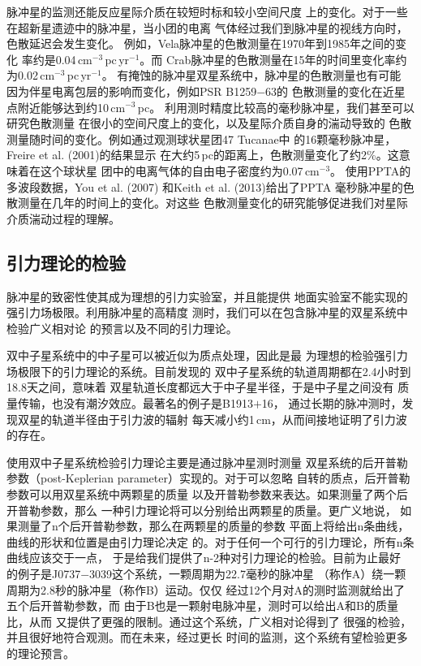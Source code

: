 脉冲星的监测还能反应星际介质在较短时标和较小空间尺度
上的变化。对于一些在超新星遗迹中的脉冲星，当小团的电离
气体经过我们到脉冲星的视线方向时，色散延迟会发生变化。
例如，Vela脉冲星的色散测量在1970年到1985年之间的变化
率约是0.04\,cm$^{-3}$\,pc\,yr$^{-1}$\supercite{hhc85}。而
Crab脉冲星的色散测量在15年的时间里变化率约为0.02\,cm$^{-3}$\,pc\,yr$^{-1}$\supercite{lps88}。
有掩蚀的脉冲星双星系统中，脉冲星的色散测量也有可能
因为伴星电离包层的影响而变化，例如PSR B1259$-$63的
色散测量的变化在近星点附近能够达到约10\,cm$^{-3}$\,pc\supercite{wjm04}。
利用测时精度比较高的毫秒脉冲星，我们甚至可以研究色散测量
在很小的空间尺度上的变化，以及星际介质自身的湍动导致的
色散测量随时间的变化。例如通过观测球状星团47 Tucanae中
的16颗毫秒脉冲星，Freire et al. (2001)\supercite{fkl+01}的结果显示
在大约5\,pc的距离上，色散测量变化了约2\%。这意味着在这个球状星
团中的电离气体的自由电子密度约为0.07\,cm$^{-3}$。
使用PPTA的多波段数据，You et al. (2007)\supercite{yhc+07}
和Keith et al. (2013)\supercite{Keith13}给出了PPTA
毫秒脉冲星的色散测量在几年的时间上的变化。对这些
色散测量变化的研究能够促进我们对星际介质湍动过程的理解。

\subsection{引力理论的检验}

脉冲星的致密性使其成为理想的引力实验室，并且能提供
地面实验室不能实现的强引力场极限。利用脉冲星的高精度
测时，我们可以在包含脉冲星的双星系统中检验广义相对论
的预言以及不同的引力理论。

双中子星系统中的中子星可以被近似为质点处理，因此是最
为理想的检验强引力场极限下的引力理论的系统。目前发现的
双中子星系统的轨道周期都在2.4小时到18.8天之间，意味着
双星轨道长度都远大于中子星半径，于是中子星之间没有
质量传输，也没有潮汐效应。最著名的例子是B1913$+$16，
通过长期的脉冲测时，发现双星的轨道半径由于引力波的辐射
每天减小约1\,cm，从而间接地证明了引力波的存在。

使用双中子星系统检验引力理论主要是通过脉冲星测时测量
双星系统的后开普勒参数（post-Keplerian parameter）实现的。对于可以忽略
自转的质点，后开普勒参数可以用双星系统中两颗星的质量
以及开普勒参数来表达。如果测量了两个后开普勒参数，那么
一种引力理论将可以分别给出两颗星的质量。更广义地说，
如果测量了n个后开普勒参数，那么在两颗星的质量的参数
平面上将给出n条曲线，曲线的形状和位置是由引力理论决定
的。对于任何一个可行的引力理论，所有n条曲线应该交于一点，
于是给我们提供了n-2种对引力理论的检验。目前为止最好
的例子是J0737$-$3039这个系统，一颗周期为22.7毫秒的脉冲星
（称作A）绕一颗周期为2.8秒的脉冲星（称作B）运动。仅仅
经过12个月对A的测时监测就给出了五个后开普勒参数，而
由于B也是一颗射电脉冲星，测时可以给出A和B的质量比，从而
又提供了更强的限制。通过这个系统，广义相对论得到了
很强的检验，并且很好地符合观测。而在未来，经过更长
时间的监测，这个系统有望检验更多的理论预言。


